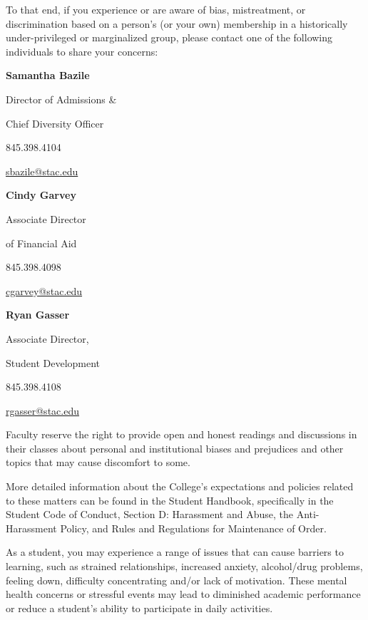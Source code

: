 \documentclass[11pt,letterpaper]{article}
\begin{document}
To that end, if you experience or are aware of bias, mistreatment, or discrimination based on a person's (or your own) membership in a historically under-privileged or marginalized group, please contact one of the following individuals to share your concerns: \pspace

	\hfill\begin{minipage}[t]{0.33\textwidth}
	{\bfseries Samantha Bazile} \par
	Director of Admissions \& \par
	Chief Diversity Officer \par
	845.398.4104 \par
	\href{mailto:sbazile@stac.edu}{sbazile@stac.edu}
	 \end{minipage}\begin{minipage}[t]{0.33\textwidth}
	{\bfseries Cindy Garvey} \par
	Associate Director \par
	of Financial Aid \par
	845.398.4098 \par
	\href{mailto:cgarvey@stac.edu}{cgarvey@stac.edu}
	\end{minipage} 
	\hfill\begin{minipage}[t]{0.33\textwidth}
	{\bfseries Ryan Gasser} \par
	Associate Director, \par
	Student Development \par
	845.398.4108 \par
	\href{mailto:rgasser@stac.edu}{rgasser@stac.edu}
	\end{minipage}\hfill \pspace

Faculty reserve the right to provide open and honest readings and discussions in their classes about personal and institutional biases and prejudices and other topics that may cause discomfort to some. \pspace

More detailed information about the College’s expectations and policies related to these matters can be found in the Student Handbook, specifically in the Student Code of Conduct, Section D: Harassment and Abuse, the Anti-Harassment Policy, and Rules and Regulations for Maintenance of Order. \sectionbreak





As a student, you may experience a range of issues that can cause barriers to learning, such as strained relationships, increased anxiety, alcohol/drug problems, feeling down, difficulty concentrating and/or lack of motivation. These mental health concerns or stressful events may lead to diminished academic performance or reduce a student's ability to participate in daily activities. \pspace
\end{document}
